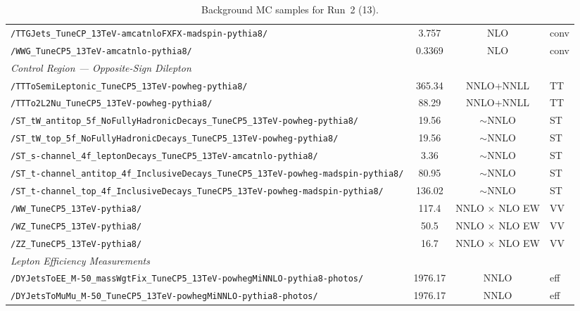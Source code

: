 \begin{table}
\begin{tabular}{lccl}
  \texttt{/TTGJets\_TuneCP\_13TeV-amcatnloFXFX-madspin-pythia8/} & 3.757 & NLO & conv \\
  \texttt{/WWG\_TuneCP5\_13TeV-amcatnlo-pythia8/} & 0.3369 & NLO & conv \\
  \hline
  \multicolumn{4}{l}{\textit{Control Region — Opposite-Sign Dilepton}} \\
  \texttt{/TTToSemiLeptonic\_TuneCP5\_13TeV-powheg-pythia8/} & 365.34 & NNLO+NNLL & TT \\
  \texttt{/TTTo2L2Nu\_TuneCP5\_13TeV-powheg-pythia8/} & 88.29 & NNLO+NNLL & TT \\
  \texttt{/ST\_tW\_antitop\_5f\_NoFullyHadronicDecays\_TuneCP5\_13TeV-powheg-pythia8/} & 19.56 & $\sim$NNLO & ST \\
  \texttt{/ST\_tW\_top\_5f\_NoFullyHadronicDecays\_TuneCP5\_13TeV-powheg-pythia8/} & 19.56 & $\sim$NNLO & ST \\
  \texttt{/ST\_s-channel\_4f\_leptonDecays\_TuneCP5\_13TeV-amcatnlo-pythia8/} & 3.36 & $\sim$NNLO & ST \\
  \texttt{/ST\_t-channel\_antitop\_4f\_InclusiveDecays\_TuneCP5\_13TeV-powheg-madspin-pythia8/} & 80.95 & $\sim$NNLO & ST \\
  \texttt{/ST\_t-channel\_top\_4f\_InclusiveDecays\_TuneCP5\_13TeV-powheg-madspin-pythia8/} & 136.02 & $\sim$NNLO & ST \\
  \texttt{/WW\_TuneCP5\_13TeV-pythia8/} & 117.4 & NNLO $\times$ NLO EW & VV \\
  \texttt{/WZ\_TuneCP5\_13TeV-pythia8/} & 50.5 & NNLO $\times$ NLO EW & VV \\
  \texttt{/ZZ\_TuneCP5\_13TeV-pythia8/} & 16.7 & NNLO $\times$ NLO EW & VV \\
  \hline
  \multicolumn{4}{l}{\textit{Lepton Efficiency Measurements}} \\
  \texttt{/DYJetsToEE\_M-50\_massWgtFix\_TuneCP5\_13TeV-powhegMiNNLO-pythia8-photos/} & 1976.17 & NNLO & eff \\
  \texttt{/DYJetsToMuMu\_M-50\_TuneCP5\_13TeV-powhegMiNNLO-pythia8-photos/} & 1976.17 & NNLO & eff \\
  \hline\hline
  \end{tabular}
  \caption{Background MC samples for Run~2 (13\TeV).}
  \label{tab:mc_bkg_run2}
\end{table}

